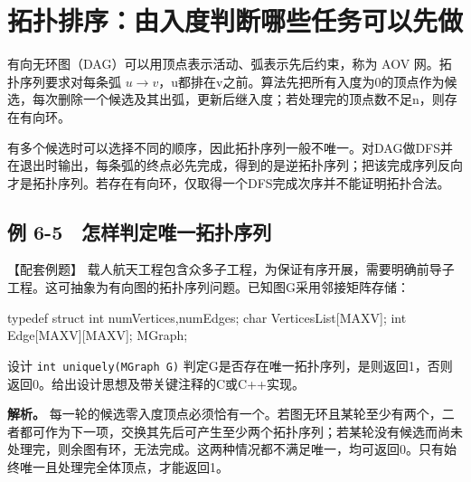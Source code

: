 \section{拓扑排序：由入度判断哪些任务可以先做}\label{DS06-08}

有向无环图（DAG）可以用顶点表示活动、弧表示先后约束，称为 AOV 网。拓扑序列要求对每条弧 \(u\to v\)，u都排在v之前。算法先把所有入度为0的顶点作为候选，每次删除一个候选及其出弧，更新后继入度；若处理完的顶点数不足n，则存在有向环。

有多个候选时可以选择不同的顺序，因此拓扑序列一般不唯一。对DAG做DFS并在退出时输出，每条弧的终点必先完成，得到的是逆拓扑序列；把该完成序列反向才是拓扑序列。若存在有向环，仅取得一个DFS完成次序并不能证明拓扑合法。

\subsection{例 6-5　怎样判定唯一拓扑序列}\label{DS06-ex5}

\begin{example}[配套案例]

【配套例题】 载人航天工程包含众多子工程，为保证有序开展，需要明确前导子工程。这可抽象为有向图的拓扑序列问题。已知图G采用邻接矩阵存储：

\par\medskip\noindent\begin{minipage}{\linewidth}
\begin{codeblock}[language=C]
typedef struct {
    int numVertices,numEdges;
    char VerticesList[MAXV];
    int Edge[MAXV][MAXV];
} MGraph;
\end{codeblock}
\end{minipage}\par\medskip

设计 \texttt{int uniquely(\allowbreak{}MGraph G)\allowbreak{}} 判定G是否存在唯一拓扑序列，是则返回1，否则返回0。给出设计思想及带关键注释的C或C++实现。

\end{example}

\textbf{解析。} 每一轮的候选零入度顶点必须恰有一个。若图无环且某轮至少有两个，二者都可作为下一项，交换其先后可产生至少两个拓扑序列；若某轮没有候选而尚未处理完，则余图有环，无法完成。这两种情况都不满足唯一，均可返回0。只有始终唯一且处理完全体顶点，才能返回1。

